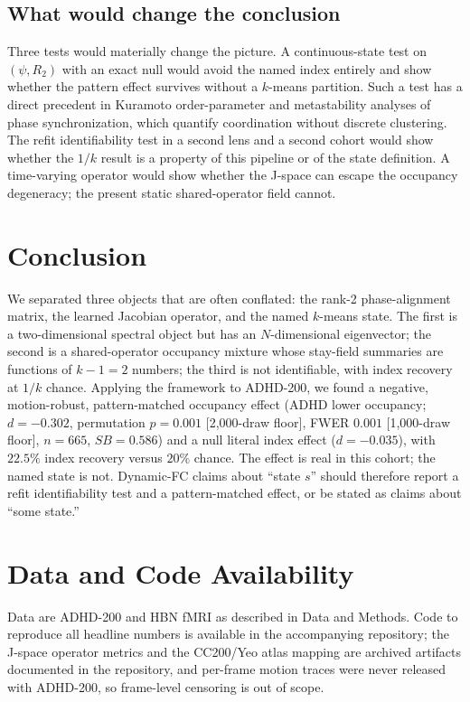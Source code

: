 \documentclass[11pt]{article}
\theoremstyle{definition}
\begin{document}
\subsection*{What would change the conclusion}

Three tests would materially change the picture. A continuous-state test on
$(\psi,R_2)$ with an exact null would avoid the named index entirely and show whether
the pattern effect survives without a $k$-means partition. Such a test has a direct
precedent in Kuramoto order-parameter and metastability analyses of phase synchronization\cite{Hancock2023},
which quantify coordination without discrete clustering. The
refit identifiability test in a second lens and a second cohort would show whether the
$1/k$ result is a property of this pipeline or of the state definition. A time-varying
operator would show whether the J-space can escape the occupancy degeneracy; the present
static shared-operator field cannot.

\section{Conclusion}
\label{sec:conclusion}

We separated three objects that are often conflated: the rank-2 phase-alignment matrix,
the learned Jacobian operator, and the named $k$-means state. The first is a
two-dimensional spectral object but has an $N$-dimensional eigenvector; the second is a
shared-operator occupancy mixture whose stay-field summaries are functions of $k-1=2$
numbers; the third is not identifiable, with index recovery at $1/k$ chance. Applying
the framework to ADHD-200, we found a negative, motion-robust, pattern-matched occupancy
effect (ADHD lower occupancy; $d=-0.302$, permutation $p=0.001$ [2,000-draw floor], FWER
$0.001$ [1,000-draw floor], $n=665$, $SB=0.586$) and a null literal index effect
($d=-0.035$), with $22.5\%$ index recovery versus $20\%$ chance. The effect is real in
this cohort; the named state is not. Dynamic-FC claims about ``state
$s$'' should therefore report a refit identifiability test and a pattern-matched effect,
or be stated as claims about ``some state.''

\section*{Data and Code Availability}
Data are ADHD-200 and HBN fMRI as described in Data and Methods. Code to reproduce
all headline numbers is available in the accompanying repository; the J-space operator
metrics and the CC200/Yeo atlas mapping are archived artifacts documented in the
repository, and per-frame motion traces were never released with ADHD-200, so
frame-level censoring is out of scope.
\end{document}
